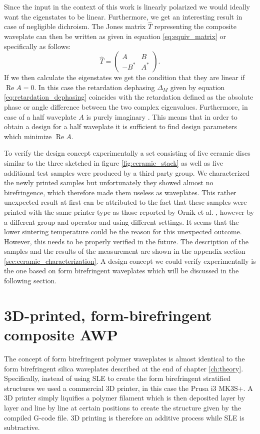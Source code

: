Since the input in the context of this work is linearly polarized we would ideally want the eigenstates to be linear. Furthermore, we get an interesting result in case of negligible dichroism. The Jones matrix $\hat{T}$ representing the composite waveplate can then be written as given in equation \ref{eq:equiv_matrix} or specifically as follows:
\begin{equation}
    \hat{T} = 
    \begin{pmatrix} 
    A & B \\
    -B^* & A^*
    \end{pmatrix}.
\end{equation}
If we then calculate the eigenstates we get the condition that they are linear if $\operatorname{Re}A=0$. In this case the retardation dephasing $\Delta_M$ given by equation \ref{eq:retardation_dephasing} coincides with the retardation defined as the absolute phase or angle difference between the two complex eigenvalues. Furthermore, in case of a half waveplate $A$ is purely imaginary \cite{McIntyre1968}. This means that in order to obtain a design for a half waveplate it is sufficient to find design parameters which minimize $\operatorname{Re}A$.

To verify the design concept experimentally a set consisting of five ceramic discs similar to the three sketched in figure \ref{fig:ceramic_stack} as well as five additional test samples were produced by a third party group. We characterized the newly printed samples but unfortunately they showed almost no birefringence, which therefore made them useless as waveplates. This rather unexpected result at first can be attributed to the fact that these samples were printed with the same printer type as those reported by Ornik et al. \cite{Ornik2021}, however by a different group and operator and using different settings. It seems that the lower sintering temperature could be the reason for this unexpected outcome. However, this needs to be properly verified in the future. The description of the samples and the results of the measurement are shown in the appendix section \ref{sec:ceramic_characterization}. A design concept we could verify experimentally is the one based on form birefringent waveplates which will be discussed in the following section.

\section{3D-printed, form-birefringent composite AWP}
The concept of form birefringent polymer waveplates is almost identical to the form birefringent silica waveplates described at the end of chapter \ref{ch:theory}. Specifically, instead of using SLE to create the form birefringent stratified structures we used a commercial 3D printer, in this case the Prusa i3 MK3S+. A 3D printer simply liquifies a polymer filament which is then deposited layer by layer and line by line at certain positions to create the structure given by the compiled G-code file. 3D printing is therefore an additive process while SLE is subtractive.

